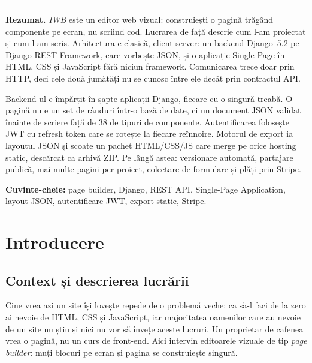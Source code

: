 \documentclass[12pt,a4paper]{report}
\begin{document}
\bigskip\hrule\bigskip

\noindent\textbf{Rezumat.}
\textit{IWB} este un editor web vizual: construiești o pagină trăgând componente pe
ecran, nu scriind cod. Lucrarea de față descrie cum l-am proiectat și cum l-am scris.
Arhitectura e clasică, client-server: un backend Django~5.2 pe Django REST
Framework, care vorbește JSON, și o aplicație Single-Page în HTML, CSS și JavaScript
fără niciun framework. Comunicarea trece doar prin HTTP, deci cele două jumătăți nu
se cunosc între ele decât prin contractul API.

Backend-ul e împărțit în șapte aplicații Django, fiecare cu o singură treabă. O
pagină nu e un set de rânduri într-o bază de date, ci un document JSON validat
înainte de scriere față de 38 de tipuri de componente. Autentificarea folosește JWT
cu refresh token care se rotește la fiecare reînnoire. Motorul de export ia layoutul
JSON și scoate un pachet HTML/CSS/JS care merge pe orice hosting static, descărcat ca
arhivă ZIP. Pe lângă astea: versionare automată, partajare publică, mai multe pagini
per proiect, colectare de formulare și plăți prin Stripe.

\bigskip
\noindent\textbf{Cuvinte-cheie:} page builder, Django, REST API, Single-Page
Application, layout JSON, autentificare JWT, export static, Stripe.

\clearpage

\tableofcontents\clearpage

\chapter{Introducere}

\section{Context și descrierea lucrării}

Cine vrea azi un site își lovește repede de o problemă veche: ca să-l faci de la
zero ai nevoie de HTML, CSS și JavaScript, iar majoritatea oamenilor care au nevoie
de un site nu știu și nici nu vor să învețe aceste lucruri. Un proprietar de cafenea
vrea o pagină, nu un curs de front-end. Aici intervin editoarele vizuale de tip
\textit{page builder}: muți blocuri pe ecran și pagina se construiește singură.
\end{document}
